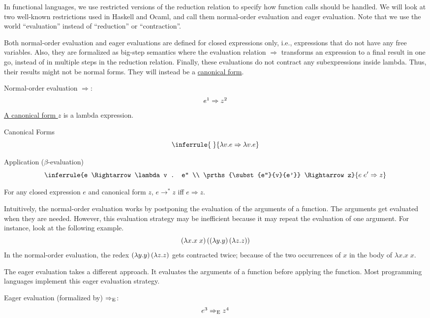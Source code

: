 \begin{enumcirc}
	\item
	In functional languages, we use restricted versions of the reduction relation
	to specify how function calls should be handled.
	We will look at two well-known restrictions used in Haskell and Ocaml, and call
	them normal-order evaluation and eager evaluation.
	Note that we use the world ``evaluation'' instead of ``reduction'' or
	``contraction''.
	\item
	Both normal-order evaluation and eager evaluations are defined for closed
	expressions only, i.e., expressions that do not have any free variables.
	Also, they are formalized as big-step semantics where the evaluation relation
	$\Rightarrow$ transforms an expression to a final result in one go, instead of
	in multiple steps in the reduction relation.
	Finally, these evaluations do not contract any subexpressions inside lambda.
	Thus, their results might not be normal forms.
	They will instead be a \ul{canonical form}.
	\item
	Normal-order evaluation $\Rightarrow$:
	\[
		e\footnotemark \Rightarrow z\footnotemark
	\]
	\ul{A canonical form $z$} is a lambda expression.

	Canonical Forms
	\[
		\inferrule{\;}{\lambda v. e \Rightarrow \lambda v. e}
	\]

	Application ($\beta$-evaluation)
	\[
		\inferrule
		{e \Rightarrow \lambda v . e'' \\ \prths{\subst{e''}{v}{e'}} \Rightarrow z}
		{e \; e' \Rightarrow z}
	\]
	\begin{property}
		For any closed expression $e$ and canonical form $z$,
		$e \rightarrow^* z$ iff $e \Rightarrow z$.
	\end{property}
	\begin{exercise}
		\todo
	\end{exercise}
	\item
	Intuitively, the normal-order evaluation works by postponing the evaluation of
	the arguments of a function.
	The arguments get evaluated when they are needed.
	However, this evaluation strategy may be inefficient because it may repeat the
	evaluation of one argument.
	For instance, look at the following example.
	\[
		\left( \lambda x. x \; x \right)
		\left( 
			\left( \lambda y. y \right)
			\left( \lambda z. z \right)
		 \right)
	\]
	In the normal-order evaluation, the redex
	$\left( \lambda y. y \right) \left( \lambda z. z \right)$
	gets contracted twice; because of the two occurrences of $x$ in the body of
	$\lambda x. x \; x$.
	\item
	The eager evaluation takes a different approach.
	It evaluates the arguments of a function before applying the function.
	Most programming languages implement this eager evaluation strategy.
	\item
	Eager evaluation (formalized by) $\Rightarrow_{\textrm{E}}$:
	\[
		e\footnotemark \RightarrowE z\footnotemark
	\]


\end{enumcirc}
